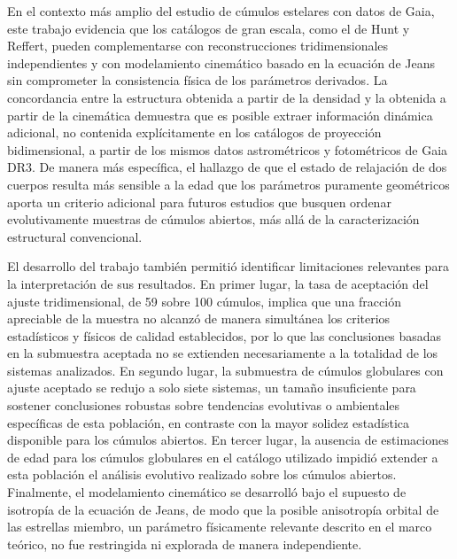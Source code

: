     En el contexto más amplio del estudio de cúmulos estelares con datos de 
    Gaia, este trabajo evidencia que los catálogos de gran escala, como el de 
    Hunt y Reffert, pueden complementarse con reconstrucciones tridimensionales 
    independientes y con modelamiento cinemático basado en la ecuación de Jeans 
    sin comprometer la consistencia física de los parámetros derivados. La 
    concordancia entre la estructura obtenida a partir de la densidad y la 
    obtenida a partir de la cinemática demuestra que es posible extraer 
    información dinámica adicional, no contenida explícitamente en los catálogos 
    de proyección bidimensional, a partir de los mismos datos astrométricos y 
    fotométricos de Gaia DR3. De manera más específica, el hallazgo de que el 
    estado de relajación de dos cuerpos resulta más sensible a la edad que los 
    parámetros puramente geométricos aporta un criterio adicional para futuros 
    estudios que busquen ordenar evolutivamente muestras de cúmulos abiertos, 
    más allá de la caracterización estructural convencional.

    El desarrollo del trabajo también permitió identificar limitaciones 
    relevantes para la interpretación de sus resultados. En primer lugar, la 
    tasa de aceptación del ajuste tridimensional, de 59 sobre 100 cúmulos, 
    implica que una fracción apreciable de la muestra no alcanzó de manera 
    simultánea los criterios estadísticos y físicos de calidad establecidos, 
    por lo que las conclusiones basadas en la submuestra aceptada no se 
    extienden necesariamente a la totalidad de los sistemas analizados. En 
    segundo lugar, la submuestra de cúmulos globulares con ajuste aceptado se 
    redujo a solo siete sistemas, un tamaño insuficiente para sostener 
    conclusiones robustas sobre tendencias evolutivas o ambientales específicas 
    de esta población, en contraste con la mayor solidez estadística disponible 
    para los cúmulos abiertos. En tercer lugar, la ausencia de estimaciones de 
    edad para los cúmulos globulares en el catálogo utilizado impidió extender a 
    esta población el análisis evolutivo realizado sobre los cúmulos abiertos. 
    Finalmente, el modelamiento cinemático se desarrolló bajo el supuesto de 
    isotropía de la ecuación de Jeans, de modo que la posible anisotropía 
    orbital de las estrellas miembro, un parámetro físicamente relevante 
    descrito en el marco teórico, no fue restringida ni explorada de manera 
    independiente.

